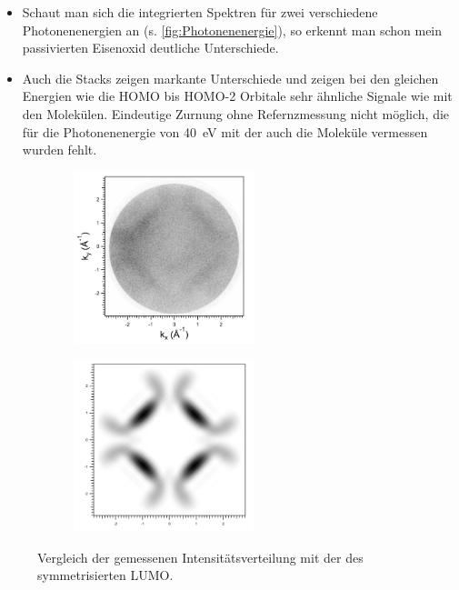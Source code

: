                 \begin{itemize}
                    \item Schaut man sich die integrierten Spektren für zwei verschiedene Photonenenergien an (s. \autoref{fig:Photonenenergie}), so erkennt man schon mein passivierten Eisenoxid deutliche Unterschiede.
                    \item Auch die Stacks zeigen markante Unterschiede und zeigen bei den gleichen Energien wie die HOMO bis HOMO-2 Orbitale sehr ähnliche Signale wie mit den Molekülen. Eindeutige Zurnung ohne Refernzmessung nicht möglich, die für die Photonenenergie von \SI{40}{\electronvolt} mit der auch die Moleküle vermessen wurden fehlt.
                \end{itemize}
                 
                \begin{figure}
                    \centering
                    \begin{subfigure}[t]{0.48\textwidth}
                        \centering
                        \includegraphics[height=5cm]{./content/pictures/FeO+5A/FeO_5A_34_80eV.png}
                    \end{subfigure}
                    \begin{subfigure}[t]{0.48\textwidth}
                        \centering
                        \includegraphics[height=5cm]{./content/pictures/FeO+5A/MO_LUMO_RT_RT.png}
                    \end{subfigure}
                    \caption{Vergleich der gemessenen Intensitätsverteilung mit der des symmetrisierten LUMO.}
                    \label{fig:FeO5A1}
                \end{figure}
